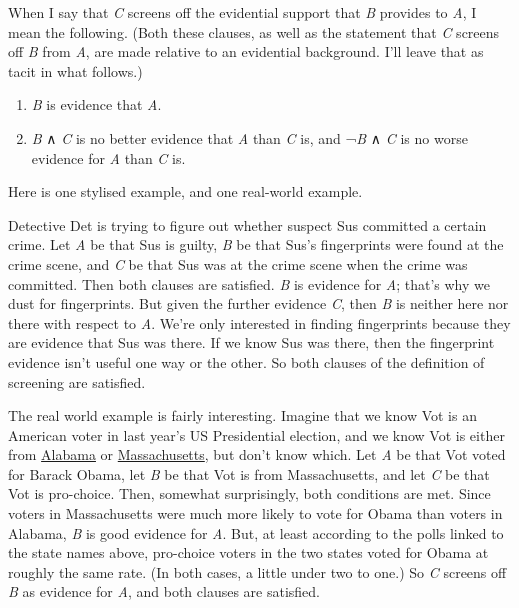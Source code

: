 \documentclass[
  11pt,
  letterpaper,
  DIV=11,
  numbers=noendperiod,
  twoside]{scrartcl}
\providecommand{\tightlist}{%
  \setlength{\itemsep}{0pt}\setlength{\parskip}{0pt}}
\begin{document}
When I say that \emph{C} screens off the evidential support that
\emph{B} provides to \emph{A}, I mean the following. (Both these
clauses, as well as the statement that \emph{C} screens off \emph{B}
from \emph{A}, are made relative to an evidential background. I'll leave
that as tacit in what follows.)

\begin{enumerate}
\def\labelenumi{\arabic{enumi}.}
\tightlist
\item
  \emph{B} is evidence that \emph{A}.
\item
  \emph{B} ∧ \emph{C} is no better evidence that \emph{A} than \emph{C}
  is, and ¬\emph{B} ∧ \emph{C} is no worse evidence for \emph{A} than
  \emph{C} is.
\end{enumerate}

Here is one stylised example, and one real-world example.

Detective Det is trying to figure out whether suspect Sus committed a
certain crime. Let \emph{A} be that Sus is guilty, \emph{B} be that
Sus's fingerprints were found at the crime scene, and \emph{C} be that
Sus was at the crime scene when the crime was committed. Then both
clauses are satisfied. \emph{B} is evidence for \emph{A}; that's why we
dust for fingerprints. But given the further evidence \emph{C}, then
\emph{B} is neither here nor there with respect to \emph{A}. We're only
interested in finding fingerprints because they are evidence that Sus
was there. If we know Sus was there, then the fingerprint evidence isn't
useful one way or the other. So both clauses of the definition of
screening are satisfied.

The real world example is fairly interesting. Imagine that we know Vot
is an American voter in last year's US Presidential election, and we
know Vot is either from
\href{http://www.surveyusa.com/client/PollReport.aspx?g=29477487-154c-440d-bd34-123e584eedfb}{Alabama}
or
\href{http://www.surveyusa.com/client/PollReport.aspx?g=3d3e8e07-a4a1-4168-8f1e-4b8ecb26215a}{Massachusetts},
but don't know which. Let \emph{A} be that Vot voted for Barack Obama,
let \emph{B} be that Vot is from Massachusetts, and let \emph{C} be that
Vot is pro-choice. Then, somewhat surprisingly, both conditions are met.
Since voters in Massachusetts were much more likely to vote for Obama
than voters in Alabama, \emph{B} is good evidence for \emph{A}. But, at
least according to the polls linked to the state names above, pro-choice
voters in the two states voted for Obama at roughly the same rate. (In
both cases, a little under two to one.) So \emph{C} screens off \emph{B}
as evidence for \emph{A}, and both clauses are satisfied.
\end{document}
